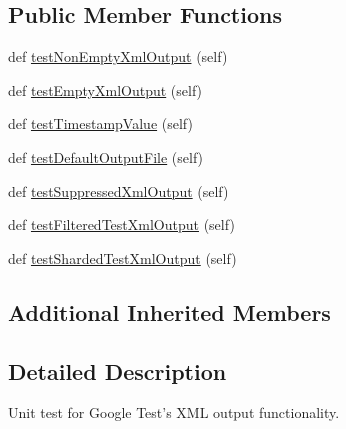 \subsection*{Public Member Functions}
\begin{DoxyCompactItemize}
\item 
def \hyperlink{classtests_1_1libs_1_1googletest-master_1_1googletest_1_1test_1_1gtest__xml__output__unittest_1_1GTestXMLOutputUnitTest_a6bbeead54a4896635124c318889ff73e}{test\+Non\+Empty\+Xml\+Output} (self)
\item 
def \hyperlink{classtests_1_1libs_1_1googletest-master_1_1googletest_1_1test_1_1gtest__xml__output__unittest_1_1GTestXMLOutputUnitTest_a70917fa84a98fb5ef1d881cb6d389bb2}{test\+Empty\+Xml\+Output} (self)
\item 
def \hyperlink{classtests_1_1libs_1_1googletest-master_1_1googletest_1_1test_1_1gtest__xml__output__unittest_1_1GTestXMLOutputUnitTest_a117132e57694d1ec1c170ff2224ff594}{test\+Timestamp\+Value} (self)
\item 
def \hyperlink{classtests_1_1libs_1_1googletest-master_1_1googletest_1_1test_1_1gtest__xml__output__unittest_1_1GTestXMLOutputUnitTest_ae30a175ba0b9b1157dca4d84a2054414}{test\+Default\+Output\+File} (self)
\item 
def \hyperlink{classtests_1_1libs_1_1googletest-master_1_1googletest_1_1test_1_1gtest__xml__output__unittest_1_1GTestXMLOutputUnitTest_adf2491e966baf87f790eaf1297fed11b}{test\+Suppressed\+Xml\+Output} (self)
\item 
def \hyperlink{classtests_1_1libs_1_1googletest-master_1_1googletest_1_1test_1_1gtest__xml__output__unittest_1_1GTestXMLOutputUnitTest_ae93ff352ecb9060f64e3e6813cca7452}{test\+Filtered\+Test\+Xml\+Output} (self)
\item 
def \hyperlink{classtests_1_1libs_1_1googletest-master_1_1googletest_1_1test_1_1gtest__xml__output__unittest_1_1GTestXMLOutputUnitTest_ace1e18053f78d1ad82146275f9e9cc21}{test\+Sharded\+Test\+Xml\+Output} (self)
\end{DoxyCompactItemize}
\subsection*{Additional Inherited Members}


\subsection{Detailed Description}
\begin{DoxyVerb}Unit test for Google Test's XML output functionality.
\end{DoxyVerb}
 

